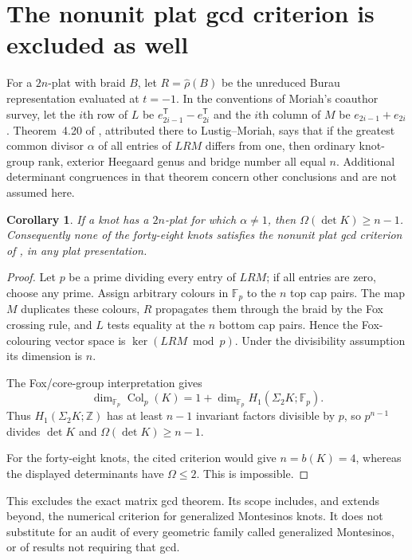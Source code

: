 \documentclass[11pt]{article}
\newtheorem{corollary}[theorem]{Corollary}
\newcommand{\Z}{\mathbb Z}
\newcommand{\F}{\mathbb F}
\begin{document}
\section{The nonunit plat gcd criterion is excluded as well}

For a $2n$-plat with braid $B$, let $R=\widehat\rho(B)$ be the
unreduced Burau representation evaluated at $t=-1$.  In the
conventions of Moriah's coauthor survey, let the $i$th row of $L$
be $e_{2i-1}^{\mathsf T}-e_{2i}^{\mathsf T}$ and the $i$th column
of $M$ be $e_{2i-1}+e_{2i}$.  Theorem~4.20 of \cite{moriah},
attributed there to Lustig--Moriah, says that if the greatest common
divisor $\alpha$ of all entries of $LRM$ differs from one, then
ordinary knot-group rank, exterior Heegaard genus and bridge number
all equal $n$.  Additional determinant congruences in that theorem
concern other conclusions and are not assumed here.

\begin{corollary}\label{cor:plat}
If a knot has a $2n$-plat for which $\alpha\ne1$, then
$\Omega(\det K)\ge n-1$.  Consequently none of the forty-eight
knots satisfies the nonunit plat gcd criterion of
\cite[Theorem~4.20]{moriah}, in any plat presentation.
\end{corollary}
\begin{proof}
Let $p$ be a prime dividing every entry of $LRM$; if all entries
are zero, choose any prime.  Assign arbitrary colours in $\F_p$
to the $n$ top cap pairs.  The map $M$ duplicates these colours,
$R$ propagates them through the braid by the Fox crossing rule,
and $L$ tests equality at the $n$ bottom cap pairs.  Hence the
Fox-colouring vector space is $\ker(LRM\bmod p)$.  Under the
divisibility assumption its dimension is $n$.

The Fox/core-group interpretation gives
\[
 \dim_{\F_p}\operatorname{Col}_p(K)
 =1+\dim_{\F_p}H_1(\Sigma_2K;\F_p).
\]
Thus $H_1(\Sigma_2K;\Z)$ has at least $n-1$ invariant factors
divisible by $p$, so $p^{n-1}$ divides $\det K$ and
$\Omega(\det K)\ge n-1$.

For the forty-eight knots, the cited criterion would give
$n=b(K)=4$, whereas the displayed determinants have
$\Omega\le2$.  This is impossible.
\end{proof}

This excludes the exact matrix gcd theorem. Its scope includes, and
extends beyond, the numerical criterion for generalized Montesinos knots.  It does
not substitute for an audit of every geometric family called
generalized Montesinos, or of results not requiring that gcd.
\end{document}
